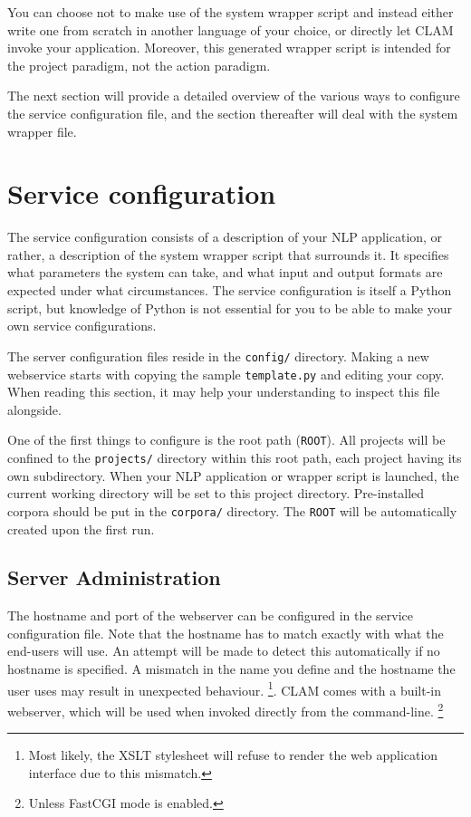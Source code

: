 \documentclass[a4paper,12pt,twoside,openright]{report}
\begin{document}
You can choose not to make use of the system wrapper script and instead either
write one from scratch in another language of your choice, or directly let CLAM
invoke your application. Moreover, this generated wrapper script is intended for the
project paradigm, not the action paradigm.

The next section will provide a detailed overview of the various ways to
configure the service configuration file, and the section thereafter will deal
with the system wrapper file.

\section{Service configuration}
\label{sec:serviceconfig}

The service configuration consists of a description of your NLP application, or
rather, a description of the system wrapper script that surrounds it. It
specifies what parameters the system can take, and what input and output
formats are expected under what circumstances. The service configuration is
itself a Python script, but knowledge of Python is not essential for you to be
able to make your own service configurations. 

The server configuration files reside in the \texttt{config/} directory. Making
a new webservice starts with copying the sample \texttt{template.py} and
editing your copy. When reading this section, it may help your understanding to
inspect this file alongside.

One of the first things to configure is the root path (\texttt{ROOT}). All
projects will be confined to the \texttt{projects/} directory within this root
path, each project having its own subdirectory. When your NLP application or
wrapper script is launched, the current working directory will be set to this
project directory. Pre-installed corpora should be put in the \texttt{corpora/}
directory. The \texttt{ROOT} will be automatically created upon the first run.


\subsection{Server Administration}
\label{sec:sadmin}

The hostname and port of the webserver can be configured in the service
configuration file. Note that the hostname has to match exactly with what the
end-users will use. An attempt will be made to detect this automatically if no
hostname is specified. A mismatch in the name you define and the hostname the
user uses may result in unexpected behaviour. \footnote{Most likely, the XSLT
stylesheet will refuse to render the web application interface due to this
mismatch.}. CLAM comes with a built-in webserver, which will be used when
invoked directly from the command-line. \footnote{Unless FastCGI mode is
enabled.}
\end{document}
